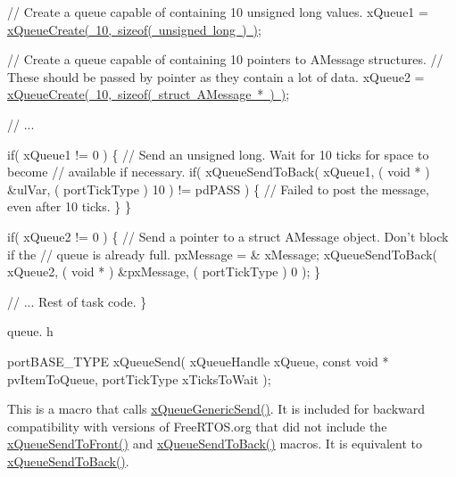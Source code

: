 \begin{DoxyPre}   // Create a queue capable of containing 10 unsigned long values.
   xQueue1 = \mbox{\hyperlink{queue_8h_aeb858b824bd74a934ea7ebb81af2a6bb}{xQueueCreate( 10, sizeof( unsigned long ) )}};\end{DoxyPre}



\begin{DoxyPre}   // Create a queue capable of containing 10 pointers to AMessage structures.
   // These should be passed by pointer as they contain a lot of data.
   xQueue2 = \mbox{\hyperlink{queue_8h_aeb858b824bd74a934ea7ebb81af2a6bb}{xQueueCreate( 10, sizeof( struct AMessage * ) )}};\end{DoxyPre}



\begin{DoxyPre}   // ...\end{DoxyPre}



\begin{DoxyPre}   if( xQueue1 != 0 )
   \{
    // Send an unsigned long.  Wait for 10 ticks for space to become
    // available if necessary.
    if( xQueueSendToBack( xQueue1, ( void * ) \&ulVar, ( portTickType ) 10 ) != pdPASS )
    \{
        // Failed to post the message, even after 10 ticks.
    \}
   \}\end{DoxyPre}



\begin{DoxyPre}   if( xQueue2 != 0 )
   \{
    // Send a pointer to a struct AMessage object.  Don't block if the
    // queue is already full.
    pxMessage = \& xMessage;
    xQueueSendToBack( xQueue2, ( void * ) \&pxMessage, ( portTickType ) 0 );
   \}\end{DoxyPre}



\begin{DoxyPre}   // ... Rest of task code.
\}
\end{DoxyPre}


queue. h 
\begin{DoxyPre}
portBASE\_TYPE xQueueSend(
                          xQueueHandle xQueue,
                          const void * pvItemToQueue,
                          portTickType xTicksToWait
                     );
  \end{DoxyPre}


This is a macro that calls \mbox{\hyperlink{queue_8h_a1ff8f61508bc9c0fa0abc44750fc1981}{x\+Queue\+Generic\+Send()}}. It is included for backward compatibility with versions of Free\+R\+T\+O\+S.\+org that did not include the \mbox{\hyperlink{queue_8h_aa612fcc2b1ceee0200f34b942e300b41}{x\+Queue\+Send\+To\+Front()}} and \mbox{\hyperlink{queue_8h_a81d24a2c1199d58efb76fbee15853112}{x\+Queue\+Send\+To\+Back()}} macros. It is equivalent to \mbox{\hyperlink{queue_8h_a81d24a2c1199d58efb76fbee15853112}{x\+Queue\+Send\+To\+Back()}}.

